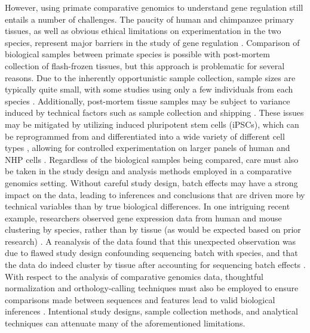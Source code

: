 However, using primate comparative genomics to understand gene regulation still entails a number of challenges. The paucity of human and chimpanzee primary tissues, as well as obvious ethical limitations on experimentation in the two species, represent major barriers in the study of gene regulation \cite{Romero.2012}. Comparison of biological samples between primate species is possible with post-mortem collection of flash-frozen tissues, but this approach is problematic for several reasons. Due to the inherently opportunistic sample collection, sample sizes are typically quite small, with some studies using only a few individuals from each species \cite{Blekhman.2008, Pai.2011, Prescott.2015}. Additionally, post-mortem tissue samples may be subject to variance induced by technical factors such as sample collection and shipping \cite{Blake.2020, Chevyreva.2008}. These issues may be mitigated by utilizing induced pluripotent stem cells (iPSCs), which can be reprogrammed from and differentiated into a wide variety of different cell types \cite{Takahashi.2006, Takahashi.2007, Sun.2009}, allowing for controlled experimentation on larger panels of human and NHP cells \cite{Romero.2015, Marchetto.2013}. Regardless of the biological samples being compared, care must also be taken in the study design and analysis methods employed in a comparative genomics setting. Without careful study design, batch effects may have a strong impact on the data, leading to inferences and conclusions that are driven more by technical variables than by true biological differences. In one intriguing recent example, researchers observed gene expression data from human and mouse clustering by species, rather than by tissue (as would be expected based on prior research) \cite{consortium.2012, Yue.2014}. A reanalysis of the data found that this unexpected observation was due to flawed study design confounding sequencing batch with species, and that the data do indeed cluster by tissue after accounting for sequencing batch effects \cite{Gilad.2015}. With respect to the analysis of comparative genomics data, thoughtful normalization and orthology-calling techniques must also be employed to ensure comparisons made between sequences and features lead to valid biological inferences \cite{Vallender.2009, Zhou.2019, Blekhman.2010, Cain.2011}. Intentional study designs, sample collection methods, and analytical techniques can attenuate many of the aforementioned limitations.


